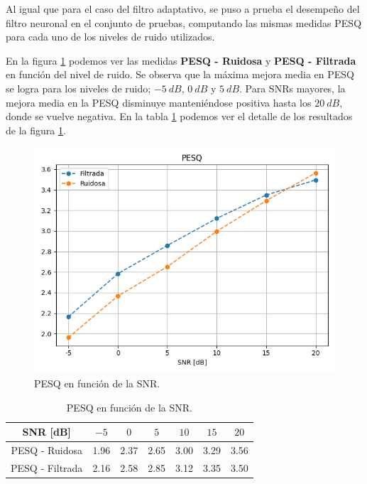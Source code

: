 Al igual que para el caso del filtro adaptativo, se puso a prueba el desempeño del filtro neuronal en el conjunto de pruebas, computando las mismas medidas PESQ para cada uno de los niveles de ruido utilizados. 

En la figura \ref{fig:ch7_pesq_by_snr} podemos ver las medidas \textbf{PESQ - Ruidosa} y \textbf{PESQ - Filtrada} en función del nivel de ruido. Se observa que la máxima mejora media en PESQ se logra para los niveles de ruido; $\SI{-5}{dB}$, $\SI{0}{dB}$ y $\SI{5}{dB}$. Para SNRs mayores, la mejora media en la PESQ disminuye manteniéndose positiva hasta los $\SI{20}{dB}$, donde se vuelve negativa. En la tabla \ref{table:ch7_pesq_by_snr} podemos ver el detalle de los resultados de la figura \ref{fig:ch7_pesq_by_snr}.

\begin{figure}
	\centering
	\centerline{\includegraphics[scale=0.75]{images/ch7/pesq_by_snr.png}}
	\caption{PESQ en función de la SNR.}
	\label{fig:ch7_pesq_by_snr}
\end{figure}

\begin{table}
	\centering
	\begin{tabular}{ |c|c|c|c|c|c|c| } 
		\hline
		SNR [dB] & $-5$ & $0$ & $5$ & $10$ & $15$ & $20$ \\ 
		\hline
		PESQ - Ruidosa & 1.96 & 2.37 & 2.65 & 3.00 & 3.29 & 3.56 \\
		PESQ - Filtrada & 2.16 & 2.58 & 2.85 & 3.12 & 3.35 & 3.50 \\
		\hline
	\end{tabular}
	\caption{PESQ en función de la SNR.}
	\label{table:ch7_pesq_by_snr}
\end{table}

